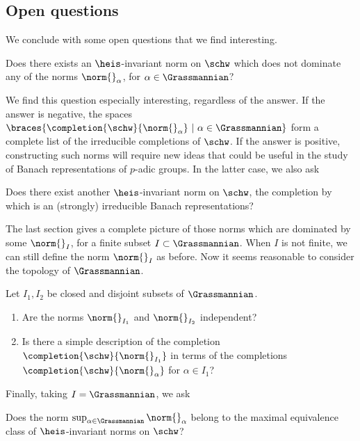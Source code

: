     
    
    
\subsection{Open questions}
We conclude with some open questions that we find interesting.
\begin{question}
Does there exists an $\heis$-invariant norm on $\schw$ which does not dominate any of the norms $\norm{}_\alpha$, for $\alpha\in\Grassmannian$?
\end{question}
We find this question especially interesting, regardless of the answer.
If the answer is negative, the spaces $\braces{\completion{\schw}{\norm{}_\alpha}\ |\ \alpha\in \Grassmannian}$ form a complete list of the irreducible completions of $\schw$.
If the answer is positive, constructing such norms will require new ideas that could be useful in the study of Banach representations of $p$-adic groups.
In the latter case, we also ask
\begin{question}
Does there exist another $\heis$-invariant norm on $\schw$, the completion by which is an (strongly) irreducible Banach representations?
\end{question}

The last section gives a complete picture of those norms which are dominated by some $\norm{}_I$, for a finite subset $I\subset \Grassmannian$.
When $I$ is not finite, we can still define the norm $\norm{}_I$ as before.
Now it seems reasonable to consider the topology of $\Grassmannian$.

\begin{question}
Let $I_1,I_2$ be closed and disjoint subsets of $\Grassmannian$.
    \begin{enumerate}
    \item Are the norms $\norm{}_{I_1}$ and $\norm{}_{I_2}$ independent?
    \item Is there a simple description of the completion $\completion{\schw}{\norm{}_{I_1}}$ in terms of the completions $\completion{\schw}{\norm{}_\alpha}$ for $\alpha\in I_1$?
    \end{enumerate}
\end{question}
Finally, taking $I=\Grassmannian$, we ask
\begin{question}
Does the norm $\sup_{\alpha\in\Grassmannian}\norm{}_\alpha$ belong to the maximal equivalence class of $\heis$-invariant norms on $\schw$?
\end{question}

    
    
    